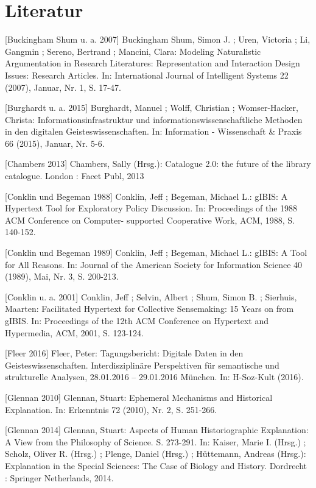 \documentclass[a4paper,
fontsize=11pt,
oneside,
numbers=noperiodatend,
parskip=half-,
bibliography=totoc,
final
]{scrartcl}
\begin{document}
\section*{Literatur}\label{literatur}

{[}Buckingham Shum u. a. 2007{]} Buckingham Shum, Simon J. ; Uren,
Victoria ; Li, Gangmin ; Sereno, Bertrand ; Mancini, Clara: Modeling
Naturalistic Argumentation in Research Literatures: Representation and
Interaction Design Issues: Research Articles. In: International Journal
of Intelligent Systems 22 (2007), Januar, Nr. 1, S. 17-47.

{[}Burghardt u. a. 2015{]} Burghardt, Manuel ; Wolff, Christian ;
Womser-Hacker, Christa: Informationsinfrastruktur und
informationswissenschaftliche Methoden in den digitalen
Geisteswissenschaften. In: Information - Wissenschaft \& Praxis 66
(2015), Januar, Nr. 5-6.

{[}Chambers 2013{]} Chambers, Sally (Hrsg.): Catalogue 2.0: the future
of the library catalogue. London : Facet Publ, 2013

{[}Conklin und Begeman 1988{]} Conklin, Jeff ; Begeman, Michael L.:
gIBIS: A Hypertext Tool for Exploratory Policy Discussion. In:
Proceedings of the 1988 ACM Conference on Computer- supported
Cooperative Work, ACM, 1988, S. 140-152.

{[}Conklin und Begeman 1989{]} Conklin, Jeff ; Begeman, Michael L.:
gIBIS: A Tool for All Reasons. In: Journal of the American Society for
Information Science 40 (1989), Mai, Nr. 3, S. 200-213.

{[}Conklin u. a. 2001{]} Conklin, Jeff ; Selvin, Albert ; Shum, Simon B.
; Sierhuis, Maarten: Facilitated Hypertext for Collective Sensemaking:
15 Years on from gIBIS. In: Proceedings of the 12th ACM Conference on
Hypertext and Hypermedia, ACM, 2001, S. 123-124.

{[}Fleer 2016{]} Fleer, Peter: Tagungsbericht: Digitale Daten in den
Geisteswissenschaften. Interdisziplinäre Perspektiven für semantische
und strukturelle Analysen, 28.01.2016 -- 29.01.2016 München. In:
H-Soz-Kult (2016).

{[}Glennan 2010{]} Glennan, Stuart: Ephemeral Mechanisms and Historical
Explanation. In: Erkenntnis 72 (2010), Nr. 2, S. 251-266.

{[}Glennan 2014{]} Glennan, Stuart: Aspects of Human Historiographic
Explanation: A View from the Philosophy of Science. S. 273-291. In:
Kaiser, Marie I. (Hrsg.) ; Scholz, Oliver R. (Hrsg.) ; Plenge, Daniel
(Hrsg.) ; Hüttemann, Andreas (Hrsg.): Explanation in the Special
Sciences: The Case of Biology and History. Dordrecht : Springer
Netherlands, 2014.
\end{document}
